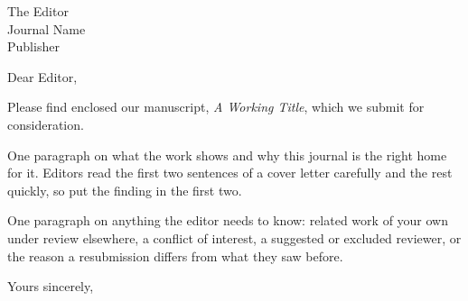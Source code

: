 \documentclass[11pt]{letter}
\begin{document}
\begin{letter}{The Editor \\ Journal Name \\ Publisher}

\opening{Dear Editor,}

Please find enclosed our manuscript, \emph{A Working Title}, which we submit
for consideration.

One paragraph on what the work shows and why this journal is the right home
for it. Editors read the first two sentences of a cover letter carefully and
the rest quickly, so put the finding in the first two.

One paragraph on anything the editor needs to know: related work of your own
under review elsewhere, a conflict of interest, a suggested or excluded
reviewer, or the reason a resubmission differs from what they saw before.

\closing{Yours sincerely,}

\end{letter}
\end{document}

